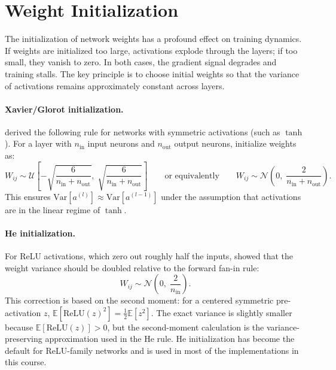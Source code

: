 \documentclass[11pt,a4paper]{report}
\newcommand{\E}[1]{\mathbb{E}\!\left[#1\right]}
\begin{document}
\section{Weight Initialization}
\label{sec:weight_init}

The initialization of network weights has a profound effect on training dynamics.  If weights are initialized too large, activations explode through the layers; if too small, they vanish to zero.  In both cases, the gradient signal degrades and training stalls.  The key principle is to choose initial weights so that the variance of activations remains approximately constant across layers.

\paragraph{Xavier/Glorot initialization.}  \citet{glorot2010understanding} derived the following rule for networks with symmetric activations (such as $\tanh$).  For a layer with $n_\mathrm{in}$ input neurons and $n_\mathrm{out}$ output neurons, initialize weights as:
\begin{equation}
W_{ij} \sim \mathcal{U}\!\left[-\sqrt{\frac{6}{n_\mathrm{in}+n_\mathrm{out}}},\; \sqrt{\frac{6}{n_\mathrm{in}+n_\mathrm{out}}}\right]
\qquad\text{or equivalently}\qquad
W_{ij} \sim \mathcal{N}\!\left(0,\; \frac{2}{n_\mathrm{in}+n_\mathrm{out}}\right).
\label{eq:xavier}
\end{equation}
This ensures $\mathrm{Var}[a^{(l)}] \approx \mathrm{Var}[a^{(l-1)}]$ under the assumption that activations are in the linear regime of $\tanh$.

\paragraph{He initialization.}  For ReLU activations, which zero out roughly half the inputs, \citet{he2015delving} showed that the weight variance should be doubled relative to the forward fan-in rule:
\begin{equation}
W_{ij} \sim \mathcal{N}\!\left(0,\; \frac{2}{n_\mathrm{in}}\right).
\label{eq:he_init}
\end{equation}
This correction is based on the second moment: for a centered symmetric pre-activation $z$, $\E{\mathrm{ReLU}(z)^2}=\tfrac12\E{z^2}$.  The exact variance is slightly smaller because $\E{\mathrm{ReLU}(z)}>0$, but the second-moment calculation is the variance-preserving approximation used in the He rule.  He initialization has become the default for ReLU-family networks and is used in most of the implementations in this course.
\end{document}
